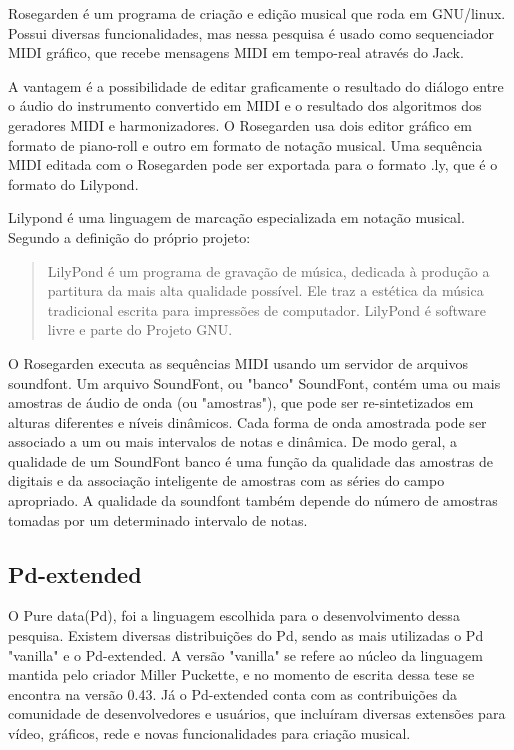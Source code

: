 \documentclass[draft]{ppgmus}
\begin{document}
Rosegarden é um programa de criação e edição musical que roda em GNU/linux.
Possui diversas funcionalidades, mas nessa pesquisa é usado como sequenciador
MIDI gráfico, que recebe mensagens MIDI em tempo-real através do Jack.

A vantagem é a possibilidade de editar graficamente o resultado do diálogo entre
o áudio do instrumento convertido em MIDI e o resultado dos algoritmos dos geradores
MIDI e harmonizadores. O Rosegarden usa dois editor gráfico em formato de piano-roll
e outro em formato de notação musical. Uma sequência MIDI editada com o Rosegarden
pode ser exportada para o formato .ly, que é o formato do Lilypond.

Lilypond é uma linguagem de marcação especializada em notação musical. Segundo
a definição do próprio projeto:

\begin{quote}
 LilyPond é um programa de gravação de música, dedicada à produção a partitura da mais alta qualidade possível. 
Ele traz a estética da música tradicional escrita para impressões de computador. LilyPond é software livre e 
parte do Projeto GNU.
\end{quote} 

O Rosegarden executa as sequências MIDI usando um servidor de arquivos soundfont.
Um arquivo SoundFont, ou "banco" SoundFont, contém uma ou mais amostras de áudio de onda (ou "amostras"),
que pode ser re-sintetizados em alturas diferentes e níveis dinâmicos. Cada forma de onda amostrada pode ser
associado a um ou mais intervalos de notas e dinâmica. De modo geral, a qualidade de um
SoundFont banco é uma função da qualidade das amostras de digitais e da associação inteligente
de amostras com as séries do campo apropriado. A qualidade da soundfont também depende do número de amostras
tomadas por um determinado intervalo de notas. 



\subsection{Pd-extended}

O Pure data(Pd), foi a linguagem escolhida para o desenvolvimento dessa pesquisa.
Existem diversas distribuições do Pd, sendo as mais utilizadas o Pd "vanilla" e o Pd-extended.
A versão "vanilla" se refere ao núcleo da linguagem mantida pelo criador Miller Puckette, e no
momento de escrita dessa tese se encontra na versão 0.43. Já o Pd-extended conta com as contribuições
da comunidade de desenvolvedores e usuários, que incluíram diversas extensões para vídeo, gráficos, rede e
novas funcionalidades para criação musical.
\end{document}
